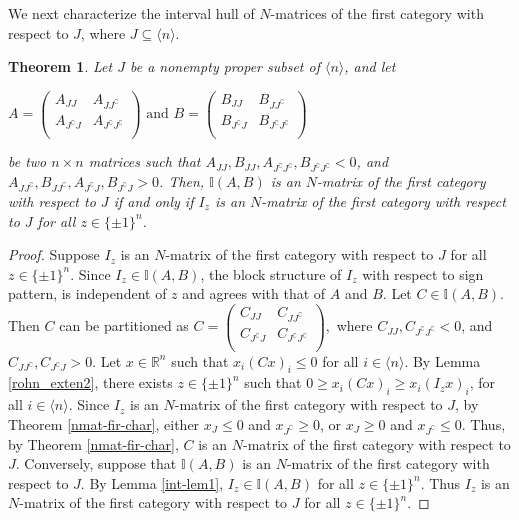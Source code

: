 \documentclass[11pt]{article}
\newtheorem{theorem}{Theorem}[section]
\begin{document}
We next characterize the interval hull of $N$-matrices of the first category with respect to $J$, where $J\subseteq \langle n \rangle$.
\begin{theorem}\label{n hull 1st}
	Let $J$ be a nonempty proper subset of $\langle n \rangle$, and let\begin{center} $A = \begin{pmatrix}
			A_{JJ} & A_{J J^\complement}\\
			A_{J^\complement J} & A_{J^\complement J^\complement} \\
			\end{pmatrix} \mbox{~and~} B = \begin{pmatrix}
			B_{JJ} & B_{J J^\complement}\\
			B_{J^\complement J} & B_{J^\complement  J^\complement} \\
			\end{pmatrix}$\end{center} be two $n \times n$ matrices such that $A_{JJ}, B_{JJ}, A_{J^\complement J^\complement}, B_{J^\complement J^\complement} < 0$, and  $A_{J J^\complement }, B_{J J^\complement}, A_{J^\complement J }, B_{J^\complement J }>0$. Then, $\mathbb{I}(A,B)$ is an $N$-matrix of the first category with respect to $J$  if and only if $I_z$ is an $N$-matrix of the first category with respect to $J$ for all $z\in \{ \pm 1 \}^n$.
\end{theorem}
\begin{proof}
	Suppose $I_z$ is an $N$-matrix of the first category with respect to $J$ for all $z\in \{ \pm 1 \}^n$. Since $I_z \in \mathbb{I}(A,B)$, the block structure of $I_z$ with respect to sign pattern, is independent of $z$ and agrees with that of $A$ and $B$. Let $C \in \mathbb{I}(A,B)$. Then $C$ can be partitioned as $C = \begin{pmatrix}
		C_{JJ} & C_{J J^\complement}\\
		C_{J^\complement J} & C_{J^\complement J^\complement} \\
		\end{pmatrix},$ where $C_{JJ}, C_{J^\complement J^\complement}< 0$, and  $C_{J J^\complement }, C_{J^\complement J }>0$. Let $x \in \mathbb{R}^n$ such that $x_i(Cx)_i\leq 0$ for all $i\in \langle n \rangle$. By Lemma \ref{rohn_exten2}, there exists  $z\in \{ \pm 1 \}^n$ such that $0\geq x_i (C x)_i \geq x_i(I_z x)_i$, for all $i\in \langle n \rangle$. Since $I_z$ is an $N$-matrix of the first category with respect to $J$,  by Theorem \ref{nmat-fir-char},  either $x_J \leq 0$ and $x_{J^\complement} \geq 0$, or $x_J \geq 0$ and $x_{J^\complement} \leq 0.$ Thus, by Theorem \ref{nmat-fir-char}, $C$ is an $N$-matrix of the first category with respect to $J$. Conversely, suppose that $\mathbb{I}(A,B)$ is an $N$-matrix of the first category with respect to $J$. By Lemma \ref{int-lem1}, $I_z \in \mathbb{I}(A,B)$ for all $z\in \{ \pm 1 \}^n$. Thus $I_z$ is an $N$-matrix of the first category with respect to $J$ for all $z\in \{ \pm 1 \}^n$.
\end{proof}
\end{document}
